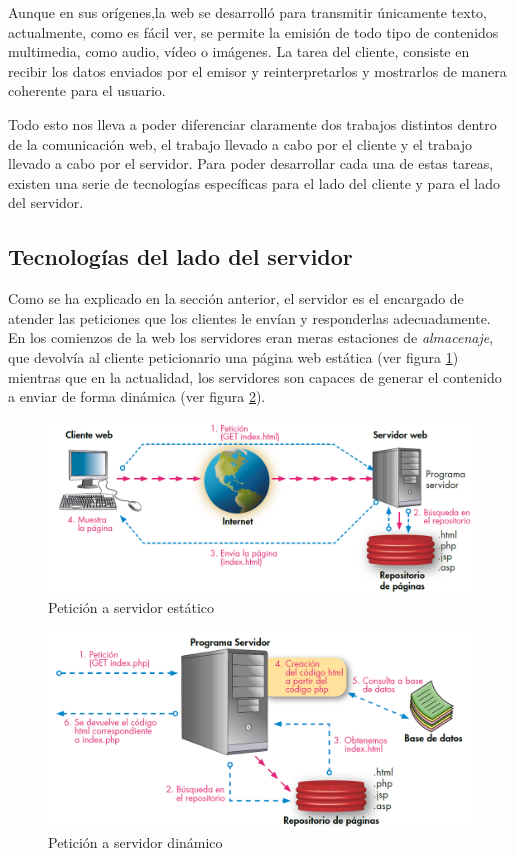 Aunque en sus orígenes,la web se desarrolló para transmitir únicamente texto, actualmente, como es fácil ver, se permite la emisión de todo tipo de contenidos multimedia, como audio, vídeo o imágenes. La tarea del cliente, consiste en recibir los datos enviados por el emisor y reinterpretarlos y mostrarlos de manera coherente para el usuario.

Todo esto nos lleva a poder diferenciar claramente dos trabajos distintos dentro de la comunicación web, el trabajo llevado a cabo por el cliente y el trabajo llevado a cabo por el servidor. Para poder desarrollar cada una de estas tareas, existen una serie de tecnologías específicas para el lado del cliente y para el lado del servidor.

\subsection{Tecnologías del lado del servidor}
Como se ha explicado en la sección anterior, el servidor es el encargado de atender las peticiones que los clientes le envían y responderlas adecuadamente. 
En los comienzos de la web los servidores eran meras estaciones de \textit{almacenaje}, que devolvía al cliente peticionario una página web estática (ver figura \ref{fig:static-server}) mientras que en la actualidad, los servidores son capaces de generar el contenido a enviar de forma dinámica (ver figura \ref{fig:dynamic-server}).

\begin{figure}[h!btp]
\centering
\includegraphics[scale=0.4, fbox={\fboxrule} 4mm]{images/03-antecedentes/12-html_request.png}
\caption{Petición a servidor estático}
\label{fig:static-server}
\end{figure}

\begin{figure}[h!btp]
\centering
\includegraphics[scale=0.5, fbox={\fboxrule} 4mm]{images/03-antecedentes/13-html_dynamic_request.png}
\caption{Petición a servidor dinámico}
\label{fig:dynamic-server}
\end{figure}

